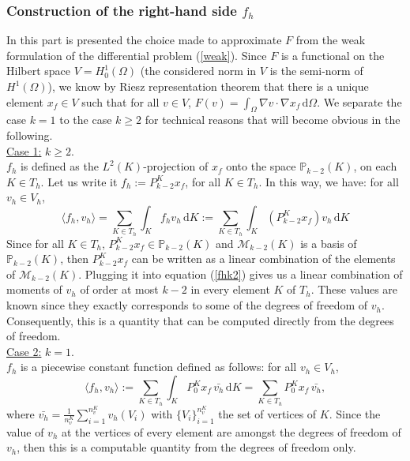 \subsubsection{Construction of the right-hand side $f_h$}
In this part is presented the choice made to approximate $F$ from the weak formulation of the differential problem (\ref{weak}). Since $F$ is a functional on the Hilbert space $V=H_0^1(\Omega)$ (the considered norm in $V$ is the semi-norm of $H^1(\Omega)$), we know by Riesz representation theorem that there is a unique element $x_f\in V$ such that for all $v\in V$, $F(v) = \int_\Omega \nabla v\cdot\nabla x_f\, \mathrm{d}\Omega$. We separate the case $k=1$ to the case $k\geq 2$ for technical reasons that will become obvious in the following.\\

\noindent \underline{Case 1:} $k\geq 2$. \\
$f_h$ is defined as the $L^2(K)$-projection of $x_f$ onto the space $\mathbb{P}_{k-2}(K)$, on each $K\in T_h$. Let us write it $f_h := P_{k-2}^Kx_f$, for all $K\in T_h$. In this way, we have: for all $v_h\in V_h$, 
\begin{equation} \label{fhk2}
\langle f_h, v_h \rangle = \sum_{K\in T_h} \int_K f_h v_h \, \mathrm{d}K := \sum_{K\in T_h}\int_K \left(P_{k-2}^Kx_f\right)v_h\, \mathrm{d}K
\end{equation}
Since for all $K\in T_h$, $P_{k-2}^Kx_f\in \mathbb{P}_{k-2}(K)$ and $\mathcal{M}_{k-2}(K)$ is a basis of $\mathbb{P}_{k-2}(K)$, then $P_{k-2}^Kx_f$ can be written as a linear combination of the elements of $\mathcal{M}_{k-2}(K)$. Plugging it into equation (\ref{fhk2}) gives us a linear combination of moments of $v_h$ of order at most $k-2$ in every element $K$ of $T_h$. These values are known since they exactly corresponds to some of the degrees of freedom of $v_h$. Consequently, this is a quantity that can be computed directly from the degrees of freedom. \\

\noindent \underline{Case 2:} $k=1$. \\
$f_h$ is a piecewise constant function defined as follows: for all $v_h\in V_h$, 
$$\langle f_h, v_h \rangle := \sum_{K\in T_h} \int_K P_0^Kx_f\, \bar{v_h} \,\mathrm{d}K = \sum_{K\in T_h}P_0^Kx_f\,\bar{v_h},$$
where $\bar{v_h} = \frac{1}{n_v^K}\sum_{i=1}^{n_v^K}v_h(V_i)$ with $\{V_i\}_{i=1}^{n_v^K}$ the set of vertices of $K$. 
Since the value of $v_h$ at the vertices of every element are amongst the degrees of freedom of $v_h$, then this is a computable quantity from the degrees of freedom only. \\

